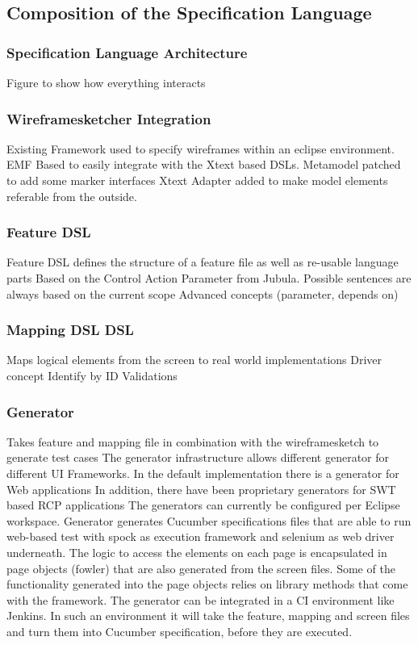 \documentclass{sig-alternate-05-2015}
\begin{document}
\subsection{Composition of the Specification Language}
\subsubsection{Specification Language Architecture}
Figure to show how everything interacts
\subsubsection{Wireframesketcher Integration}
Existing Framework used to specify wireframes within an eclipse environment.
EMF Based to easily integrate with the Xtext based DSLs.
Metamodel patched to add some marker interfaces
Xtext Adapter added to make model elements referable from the outside.

\subsubsection{Feature DSL}
Feature DSL defines the structure of a feature file as well as re-usable language parts
Based on the Control Action Parameter from Jubula.
Possible sentences are always based on the current scope
Advanced concepts (parameter, depends on)

\subsubsection{Mapping DSL DSL}
Maps logical elements from the screen to real world implementations
Driver concept
Identify by ID
Validations


\subsubsection{Generator}
Takes feature and mapping file in combination with the wireframesketch to generate test cases
The generator infrastructure allows different generator for different UI Frameworks. In the default implementation there is a generator for Web applications
In addition, there have been proprietary generators for SWT based RCP applications
The generators can currently be configured per Eclipse workspace.
Generator generates Cucumber specifications files that are able to run web-based test with spock as execution framework and selenium as web driver underneath. 
The logic to access the elements on each page is encapsulated in page objects (fowler) that are also generated from the screen files. Some of the functionality generated into the page objects relies on library methods that come with the framework. 
The generator can be integrated in a CI environment like Jenkins. In such an environment it will take the feature, mapping and screen files and turn them into Cucumber specification, before they are executed. 
\end{document}
